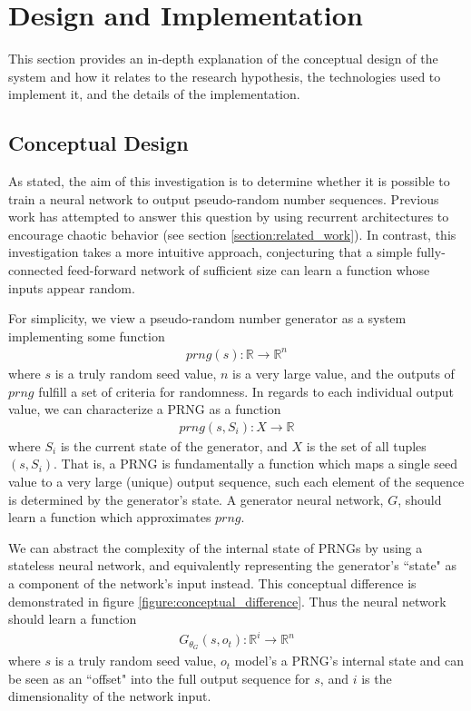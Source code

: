 \documentclass[12pt, titlepage]{report}
\theoremstyle{definition}
\begin{document}
\chapter{Design and Implementation}\label{chapter:design}
This section provides an in-depth explanation of the conceptual design of the system and how it relates to the research hypothesis, the technologies used to implement it, and the details of the implementation.



\section{Conceptual Design}\label{section:conceptual_design}
As stated, the aim of this investigation is to determine whether it is possible to train a neural network to output pseudo-random number sequences. Previous work has attempted to answer this question by using recurrent architectures to encourage chaotic behavior (see section \ref{section:related_work}). In contrast, this investigation takes a more intuitive approach, conjecturing that a simple fully-connected feed-forward network of sufficient size can learn a function whose inputs appear random.

For simplicity, we view a pseudo-random number generator as a system implementing some function
\begin{gather}\label{eq:conceptual_prng}
prng(s) : \mathbb{R} \rightarrow \mathbb{R}^n
\end{gather}
where $s$ is a truly random seed value, $n$ is a very large value, and the outputs of $prng$ fulfill a set of criteria for randomness. In regards to each individual output value, we can characterize a PRNG as a function 
\begin{gather}
prng(s, S_i) : X \rightarrow \mathbb{R}
\end{gather}
where $S_i$ is the current state of the generator, and $X$ is the set of all tuples $(s, S_i)$. That is, a PRNG is fundamentally a function which maps a single seed value to a very large (unique) output sequence, such each element of the sequence is determined by the generator's state. A generator neural network, $G$, should learn a function which approximates $prng$.

We can abstract the complexity of the internal state of PRNGs by using a stateless neural network, and equivalently representing the generator's ``state" as a component of the network's input instead. This conceptual difference is demonstrated in figure \ref{figure:conceptual_difference}. Thus the neural network should learn a function
\begin{gather}
G_{\theta_{G}}(s, o_t) : \mathbb{R}^i \rightarrow \mathbb{R}^n
\end{gather}
where $s$ is a truly random seed value, $o_t$ model's a PRNG's internal state and can be seen as an ``offset" into the full output sequence for $s$, and $i$ is the dimensionality of the network input.
\end{document}
